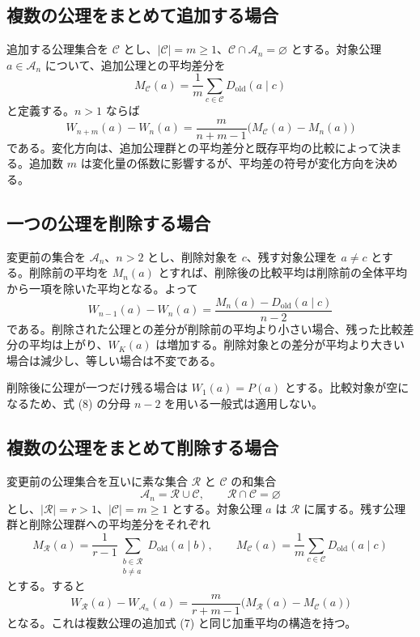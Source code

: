 \subsection{複数の公理をまとめて追加する場合}

追加する公理集合を $\mathcal{C}$ とし、$|\mathcal{C}|=m\ge1$、$\mathcal{C}\cap\mathcal{A}_n=\varnothing$ とする。対象公理 $a\in\mathcal{A}_n$ について、追加公理との平均差分を
\[
M_{\mathcal{C}}(a)=\frac1m\sum_{c\in\mathcal{C}}D_{\mathrm{old}}(a\mid c)
\]
と定義する。$n>1$ ならば
\[
\boxed{
W_{n+m}(a)-W_n(a)
=\frac{m}{n+m-1}
\bigl(M_{\mathcal{C}}(a)-M_n(a)\bigr)
}
\tag{7}
\]
である。変化方向は、追加公理群との平均差分と既存平均の比較によって決まる。追加数 $m$ は変化量の係数に影響するが、平均差の符号が変化方向を決める。

\subsection{一つの公理を削除する場合}

変更前の集合を $\mathcal{A}_n$、$n>2$ とし、削除対象を $c$、残す対象公理を $a\ne c$ とする。削除前の平均を $M_n(a)$ とすれば、削除後の比較平均は削除前の全体平均から一項を除いた平均となる。よって
\[
\boxed{
W_{n-1}(a)-W_n(a)
=\frac{M_n(a)-D_{\mathrm{old}}(a\mid c)}{n-2}
}
\tag{8}
\]
である。削除された公理との差分が削除前の平均より小さい場合、残った比較差分の平均は上がり、$W_K(a)$ は増加する。削除対象との差分が平均より大きい場合は減少し、等しい場合は不変である。

削除後に公理が一つだけ残る場合は $W_1(a)=P(a)$ とする。比較対象が空になるため、式 (8) の分母 $n-2$ を用いる一般式は適用しない。

\subsection{複数の公理をまとめて削除する場合}

変更前の公理集合を互いに素な集合 $\mathcal{R}$ と $\mathcal{C}$ の和集合
\[
\mathcal{A}_n=\mathcal{R}\cup\mathcal{C},\qquad
\mathcal{R}\cap\mathcal{C}=\varnothing
\]
とし、$|\mathcal{R}|=r>1$、$|\mathcal{C}|=m\ge1$ とする。対象公理 $a$ は $\mathcal{R}$ に属する。残す公理群と削除公理群への平均差分をそれぞれ
\[
M_{\mathcal{R}}(a)=\frac1{r-1}\sum_{\substack{b\in\mathcal{R}\\b\ne a}}D_{\mathrm{old}}(a\mid b),\qquad
M_{\mathcal{C}}(a)=\frac1m\sum_{c\in\mathcal{C}}D_{\mathrm{old}}(a\mid c)
\]
とする。すると
\[
\boxed{
W_{\mathcal{R}}(a)-W_{\mathcal{A}_n}(a)
=\frac{m}{r+m-1}
\bigl(M_{\mathcal{R}}(a)-M_{\mathcal{C}}(a)\bigr)
}
\tag{9}
\]
となる。これは複数公理の追加式 (7) と同じ加重平均の構造を持つ。

